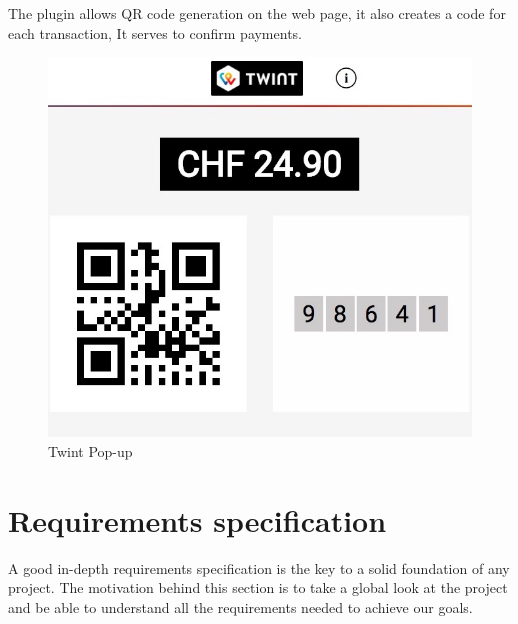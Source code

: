 \begin{spacing}{1.2}
\begin{itemize}
The plugin allows QR code generation on the web page, it also creates a code for each transaction, It serves to confirm payments.
\begin{figure}[!ht]\centering
\includegraphics[scale=0.3]{twint.jpg}
\caption{Twint Pop-up}
\label{fig:fig1}
\end{figure}
  \end{itemize}
  
  

\section{Requirements specification}
A good in-depth requirements specification is the key to a solid foundation of any project.
The motivation behind this section is to take a global look at the project and be able to understand all the requirements needed to achieve our goals.

\end{spacing}
